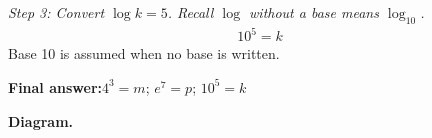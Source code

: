 \documentclass[11pt]{article}
\begin{document}
\textit{Step 3: Convert \( \log k = 5 \). Recall \( \log \) without a base means \( \log_{10} \).}
\[\begin{gathered}
10^5 = k
\end{gathered}\]
Base 10 is assumed when no base is written.

\begin{answerbox}
\textbf{Final answer:}\quad \(\displaystyle  4^3 = m \); \(\displaystyle  e^7 = p \); \(\displaystyle  10^5 = k \)
\end{answerbox}
\textbf{Diagram.}

\begin{center}
\end{center}
\end{document}
